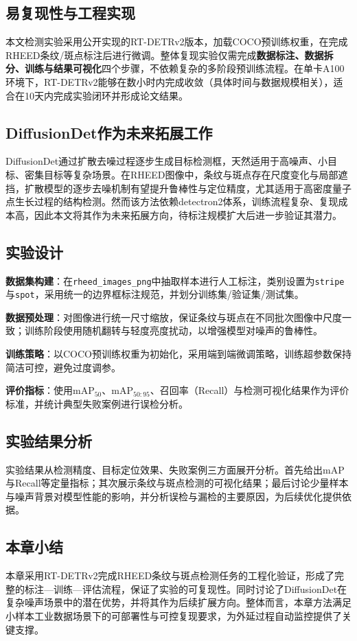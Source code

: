 \subsection{易复现性与工程实现}

本文检测实验采用公开实现的RT-DETRv2版本，加载COCO预训练权重，在完成RHEED条纹/斑点标注后进行微调。整体复现实验仅需完成\textbf{数据标注、数据拆分、训练与结果可视化}四个步骤，不依赖复杂的多阶段预训练流程。在单卡A100环境下，RT-DETRv2能够在数小时内完成收敛（具体时间与数据规模相关），适合在10天内完成实验闭环并形成论文结果。

\subsection{DiffusionDet作为未来拓展工作}

DiffusionDet通过扩散去噪过程逐步生成目标检测框，天然适用于高噪声、小目标、密集目标等复杂场景。在RHEED图像中，条纹与斑点存在尺度变化与局部遮挡，扩散模型的逐步去噪机制有望提升鲁棒性与定位精度，尤其适用于高密度量子点生长过程的结构检测。然而该方法依赖detectron2体系，训练流程复杂、复现成本高，因此本文将其作为未来拓展方向，待标注规模扩大后进一步验证其潜力。

\subsection{实验设计}

\textbf{数据集构建}：在\texttt{rheed\_images\_png}中抽取样本进行人工标注，类别设置为\texttt{stripe}与\texttt{spot}，采用统一的边界框标注规范，并划分训练集/验证集/测试集。

\textbf{数据预处理}：对图像进行统一尺寸缩放，保证条纹与斑点在不同批次图像中尺度一致；训练阶段使用随机翻转与轻度亮度扰动，以增强模型对噪声的鲁棒性。

\textbf{训练策略}：以COCO预训练权重为初始化，采用端到端微调策略，训练超参数保持简洁可控，避免过度调参。

\textbf{评价指标}：使用mAP$_{50}$、mAP$_{50:95}$、召回率（Recall）与检测可视化结果作为评价标准，并统计典型失败案例进行误检分析。

\subsection{实验结果分析}

实验结果从检测精度、目标定位效果、失败案例三方面展开分析。首先给出mAP与Recall等定量指标；其次展示条纹与斑点检测的可视化结果；最后讨论少量样本与噪声背景对模型性能的影响，并分析误检与漏检的主要原因，为后续优化提供依据。

\subsection{本章小结}

本章采用RT-DETRv2完成RHEED条纹与斑点检测任务的工程化验证，形成了完整的标注—训练—评估流程，保证了实验的可复现性。同时讨论了DiffusionDet在复杂噪声场景中的潜在优势，并将其作为后续扩展方向。整体而言，本章方法满足小样本工业数据场景下的可部署性与可控复现要求，为外延过程自动监控提供了关键支撑。
